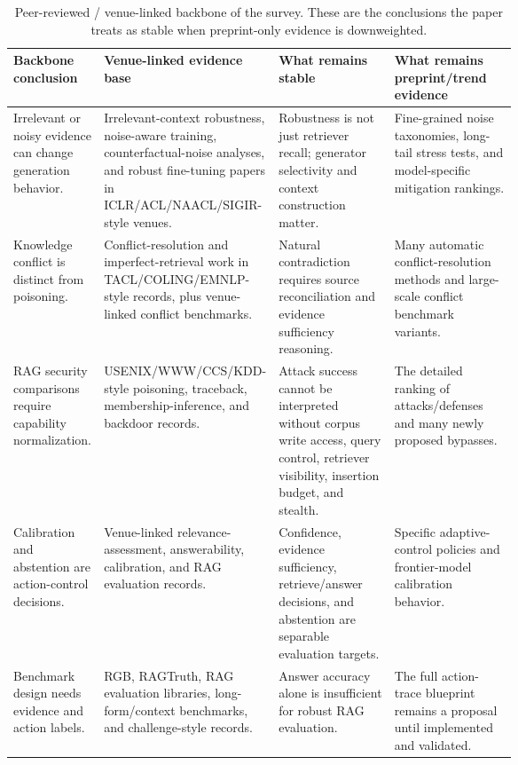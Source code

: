 \documentclass[11pt]{article}
\begin{document}

\begin{table}[t]
\centering
\scriptsize
\renewcommand{\arraystretch}{0.9}
\begin{tabularx}{\linewidth}{>{\raggedright\arraybackslash}p{0.18\linewidth}>{\raggedright\arraybackslash}p{0.25\linewidth}>{\raggedright\arraybackslash}p{0.23\linewidth}X}
\toprule
\textbf{Backbone conclusion} & \textbf{Venue-linked evidence base} & \textbf{What remains stable} & \textbf{What remains preprint/trend evidence} \\
\midrule
Irrelevant or noisy evidence can change generation behavior. & Irrelevant-context robustness, noise-aware training, counterfactual-noise analyses, and robust fine-tuning papers in ICLR/ACL/NAACL/SIGIR-style venues. & Robustness is not just retriever recall; generator selectivity and context construction matter. & Fine-grained noise taxonomies, long-tail stress tests, and model-specific mitigation rankings. \\
Knowledge conflict is distinct from poisoning. & Conflict-resolution and imperfect-retrieval work in TACL/COLING/EMNLP-style records, plus venue-linked conflict benchmarks. & Natural contradiction requires source reconciliation and evidence sufficiency reasoning. & Many automatic conflict-resolution methods and large-scale conflict benchmark variants. \\
RAG security comparisons require capability normalization. & USENIX/WWW/CCS/KDD-style poisoning, traceback, membership-inference, and backdoor records. & Attack success cannot be interpreted without corpus write access, query control, retriever visibility, insertion budget, and stealth. & The detailed ranking of attacks/defenses and many newly proposed bypasses. \\
Calibration and abstention are action-control decisions. & Venue-linked relevance-assessment, answerability, calibration, and RAG evaluation records. & Confidence, evidence sufficiency, retrieve/answer decisions, and abstention are separable evaluation targets. & Specific adaptive-control policies and frontier-model calibration behavior. \\
Benchmark design needs evidence and action labels. & RGB, RAGTruth, RAG evaluation libraries, long-form/context benchmarks, and challenge-style records. & Answer accuracy alone is insufficient for robust RAG evaluation. & The full action-trace blueprint remains a proposal until implemented and validated. \\
\bottomrule
\end{tabularx}
\caption{Peer-reviewed / venue-linked backbone of the survey. These are the conclusions the paper treats as stable when preprint-only evidence is downweighted.}
\label{tab:peer-reviewed-backbone}
\end{table}
\end{document}
